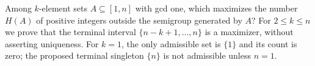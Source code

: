 Among $k$-element sets $A\subseteq[1,n]$ with gcd one, which maximizes the number $H(A)$ of positive integers outside the semigroup generated by $A$? For $2\le k\le n$ we prove that the terminal interval $\{n-k+1,\ldots,n\}$ is a maximizer, without asserting uniqueness. For $k=1$, the only admissible set is $\{1\}$ and its count is zero; the proposed terminal singleton $\{n\}$ is not admissible unless $n=1$.
